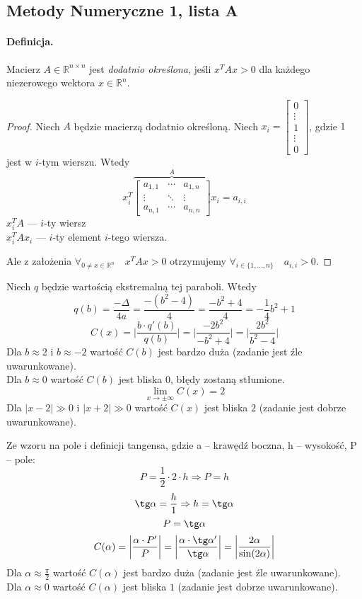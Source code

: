 \documentclass[12pt]{article}
\newcommand{\R}{\mathbb{R}}
\newenvironment{lista}[2][]{\newpage
\begin{center}
    \section[Lista \textbf{#2}]{Metody Numeryczne 1, lista #2}
\end{center}
\bigskip
#1
\begin{enumerate}[label=\textbf{#2\arabic*.}]}{\end{enumerate}}
\begin{document}
\begin{lista}[\paragraph*{Definicja.} Macierz $A\in\R^{n\times n}$ jest \emph{dodatnio określona}, jeśli $x^TAx>0$ dla każdego niezerowego wektora $x\in\R^n$.]{A}
    \begin{mdframed}
        \begin{proof}
            Niech $A$ będzie macierzą dodatnio określoną. Niech $x_i = \begin{bmatrix} 0 \\ \vdots \\ 1 \\ \vdots \\ 0 \end{bmatrix}$, gdzie $1$ jest w $i$-tym wierszu. Wtedy
            \[ x_i^T\overbrace{\begin{bmatrix} a_{1,1} & \cdots & a_{1,n} \\ \vdots & \ddots & \vdots \\ a_{n,1} & \cdots & a_{n,n} \end{bmatrix}}^A x_i = a_{i,i}\]
            $x_i^TA$ --- $i$-ty wiersz\\
            $x_i^TAx_i$ --- $i$-ty element $i$-tego wiersza.

            Ale z założenia $\forall_{0\neq x\in\R^n} \quad x^TAx > 0$ otrzymujemy $\forall_{i \in\{1,\dots,n\}}\quad a_{i,i} > 0$.
        \end{proof}
    \end{mdframed}
\end{lista}


\begin{mdframed}
    Niech $q$ będzie wartością ekstremalną tej paraboli. Wtedy
    \[ q(b) = \frac{-\Delta}{4a} = \frac{-(b^2-4)}{4} = \frac{-b^2+4}{4} = -\frac{1}{4}b^2 + 1 \]
    \[ C(x) = \biggl|\frac{b\cdot q'(b)}{q(b)}\biggr| = \biggl|\frac{-2b^2}{-b^2+4}\biggr| = \biggl|\frac{2b^2}{b^2-4}\biggr| \]
    Dla $b \approx 2$ i $b \approx -2$ wartość $C(b)$ jest bardzo duża (zadanie jest źle uwarunkowane).\\
    Dla $b \approx 0$ wartość $C(b)$ jest bliska $0$, błędy zostaną stłumione.
    \[ \lim_{x\to\pm\infty} C(x) = 2\]
    Dla $|x - 2| \gg 0$ i $|x + 2| \gg 0$ wartość $C(x)$ jest bliska $2$ (zadanie jest dobrze uwarunkowane).
\end{mdframed}


\begin{mdframed}
    Ze wzoru na pole i definicji tangensa, gdzie a -- krawędź boczna, h -- wysokość, P -- pole:
    \[ P = \frac{1}{2}\cdot2\cdot h \Rightarrow P = h \]
    \[ \tg \alpha = \frac{h}{1} \Rightarrow h = \tg \alpha \]
    \[ P = \tg \alpha \]
    \[ C(\alpha) = \biggl|\frac{\alpha\cdot P'}{P}\biggr| = \biggl|\frac{\alpha\cdot \tg \alpha'}{\tg \alpha}\biggr| = \biggl|\frac{2\alpha}{\sin(2\alpha)}\biggr| \]
    Dla $\alpha \approx \frac{\pi}{2}$ wartość $C(\alpha)$ jest bardzo duża (zadanie jest źle uwarunkowane).\\
    Dla $\alpha \approx 0$ wartość $C(\alpha)$ jest bliska $1$ (zadanie jest dobrze uwarunkowane).
\end{mdframed}
\end{document}
